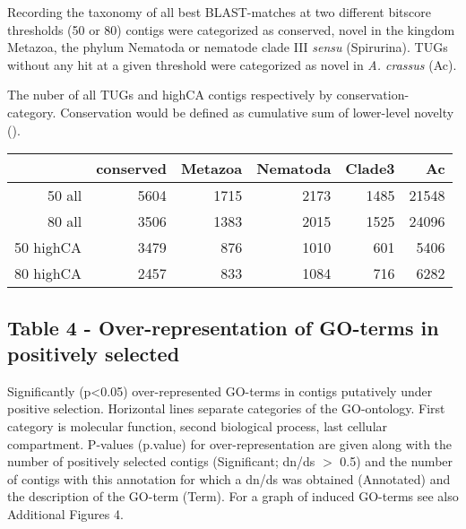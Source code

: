 \documentclass[10pt]{bmc_article}
\newenvironment{bmcformat}{\begin{raggedright}\baselineskip20pt\sloppy\setboolean{publ}{false}}{\end{raggedright}\baselineskip20pt\sloppy}
\begin{document}
\begin{bmcformat}
Recording the taxonomy of all best BLAST-matches at two different
bitscore thresholds (50 or 80) contigs were categorized as conserved,
novel in the kingdom Metazoa, the phylum Nematoda or nematode clade
III \textit{sensu} \cite{blaxter_molecular_1998} (Spirurina). TUGs
without any hit at a given threshold were categorized as novel in
\textit{A. crassus} (Ac).  

The nuber of all TUGs and highCA contigs respectively by conservation-
category. Conservation would be defined as cumulative sum of
lower-level novelty ().

\begin{tabular}{rrrrrr}
  \hline
 & conserved & Metazoa & Nematoda & Clade3 & Ac \\ 
  \hline
50 all & 5604 & 1715 & 2173 & 1485 & 21548 \\ 
  80 all & 3506 & 1383 & 2015 & 1525 & 24096 \\ 
  50 highCA & 3479 & 876 & 1010 & 601 & 5406 \\ 
  80 highCA & 2457 & 833 & 1084 & 716 & 6282 \\ 
   \hline
\end{tabular}
\subsection*{Table 4 - Over-representation of GO-terms in positively
  selected}

Significantly (p<0.05) over-represented GO-terms in contigs putatively
under positive selection. Horizontal lines separate categories of the
GO-ontology. First category is molecular function, second biological
process, last cellular compartment. P-values (p.value) for
over-representation are given along with the number of positively
selected contigs (Significant; dn/ds $>$ 0.5) and the number of
contigs with this annotation for which a dn/ds was obtained
(Annotated) and the description of the GO-term (Term). For a graph of
induced GO-terms see also Additional Figures 4.


\end{bmcformat}
\end{document}
